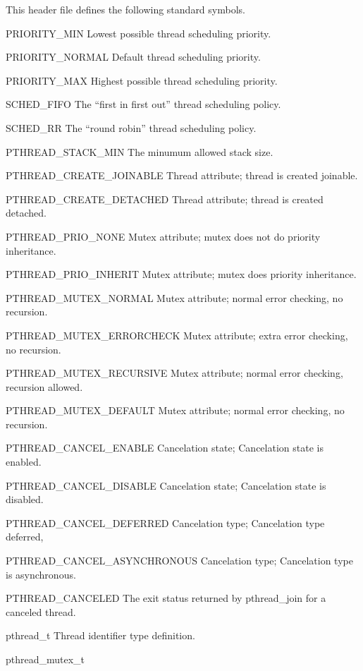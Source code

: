 \begin{apidesc}
	This header file defines the following standard symbols.
	\begin{icsymlist}
	\item[PRIORITY_MIN]
		Lowest possible thread scheduling priority.
	\item[PRIORITY_NORMAL]
		Default thread scheduling priority.
	\item[PRIORITY_MAX]
		Highest possible thread scheduling priority.
	\item[SCHED_FIFO]
		The ``first in first out'' thread scheduling policy.
	\item[SCHED_RR]
		The ``round robin'' thread scheduling policy.
	\item[PTHREAD_STACK_MIN]
		The minumum allowed stack size.
	\item[PTHREAD_CREATE_JOINABLE]
		Thread attribute; thread is created joinable.
	\item[PTHREAD_CREATE_DETACHED]
		Thread attribute; thread is created detached.
	\item[PTHREAD_PRIO_NONE]
		Mutex attribute; mutex does not do priority inheritance.
	\item[PTHREAD_PRIO_INHERIT]
		Mutex attribute; mutex does priority inheritance.
	\item[PTHREAD_MUTEX_NORMAL]
		Mutex attribute; normal error checking, no recursion.
	\item[PTHREAD_MUTEX_ERRORCHECK]
		Mutex attribute; extra error checking, no recursion.
	\item[PTHREAD_MUTEX_RECURSIVE]
		Mutex attribute; normal error checking, recursion allowed.
	\item[PTHREAD_MUTEX_DEFAULT]
		Mutex attribute; normal error checking, no recursion.
	\item[PTHREAD_CANCEL_ENABLE]
		Cancelation state; Cancelation state is enabled.
	\item[PTHREAD_CANCEL_DISABLE]
		Cancelation state; Cancelation state is disabled.
	\item[PTHREAD_CANCEL_DEFERRED]
		Cancelation type; Cancelation type deferred,
	\item[PTHREAD_CANCEL_ASYNCHRONOUS]
		Cancelation type; Cancelation type is asynchronous.
	\item[PTHREAD_CANCELED]
		The exit status returned by pthread_join for a canceled thread.
	\item[pthread_t]
		Thread identifier type definition.
	\item[pthread_mutex_t]

\end{icsymlist}
\end{apidesc}
